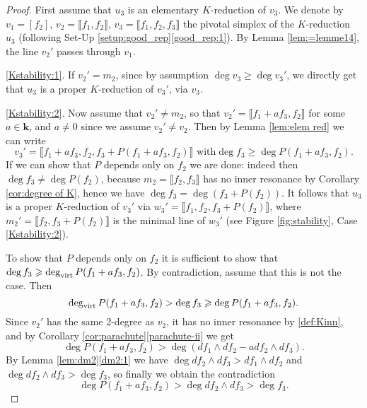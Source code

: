 \documentclass[reqno,oneside,11pt]{amsart}
\theoremstyle{plain}
\theoremstyle{definition}
\newcommand{\K}{\mathbf{k}}
\newcommand{\dvirt}{\deg_{\text{\rm virt}}}
\newcommand{\llb}{\llbracket}
\newcommand{\rrb}{\rrbracket}
\renewcommand{\ge}{\geqslant}
\begin{document}
\begin{proof}
First assume that $u_3$ is an elementary $K$-reduction of $v_3$.
We denote by $v_1 = [ f_2 ]$,
$v_2 = \llb f_1,f_2 \rrb$, $v_3 = \llb f_1, f_2, f_3 \rrb$ the pivotal simplex
of the $K$-reduction $u_3$ (following Set-Up
\ref{setup:good_rep}\ref{good_rep:1}).
By Lemma \ref{lem:=lemme14}, the line $v_2'$ passes through $v_1$.


\ref{Kstability:1}. If $v_2' = m_2$, since by
assumption $\deg v_3 \ge \deg v_3'$, we directly get that $u_3$ is a proper
$K$-reduction of $v_3'$, via $v_3$.

\ref{Kstability:2}. Now assume that $v_2' \neq m_2$, so
that $v_2' =\llb f_1 + af_3, f_2 \rrb$ for some $a \in \K$, and $a \neq 0$
since we assume $v_2' \neq v_2$.
Then by Lemma \ref{lem:elem red} we can write
$$v_3' =  \llb f_1 + af_3, f_2, f_3 +P( f_1 + af_3, f_2) \rrb \text{ with
} \deg f_3 \ge \deg P( f_1 + af_3, f_2).$$
If we can show that $P$ depends only on $f_2$ we are done: indeed then
$\deg f_3 \neq \deg P(f_2)$, because $m_2 = \llb f_2, f_3 \rrb$ has no inner
resonance by Corollary \ref{cor:degree of K}, hence we have $\deg f_3 =
\deg (f_3 + P(f_2))$.
It follows that $u_3$ is
a proper $K$-reduction of $v_3'$ via $w_3' = \llb f_1, f_2, f_3 + P(f_2) \rrb$,
where $m_2' = \llb f_2, f_3 + P(f_2) \rrb$ is the minimal line of $w_3'$ (see
Figure \ref{fig:stability}, Case \ref{Kstability:2}).

To show that $P$ depends only on $f_2$ it is sufficient to show that $\deg f_3
\ge \dvirt  P( f_1 + af_3, f_2)$.
By contradiction, assume that this is not the case.
Then
$$\dvirt  P( f_1 + af_3, f_2) > \deg f_3 \ge \deg  P( f_1 + af_3, f_2).$$
Since $v_2'$ has the same 2-degree as $v_2$, it has no inner resonance by
\ref{def:Kinn}, and by Corollary \ref{cor:parachute}\ref{parachute-ii} we get
$$\deg  P( f_1 + af_3, f_2) > \deg (df_1 \wedge df_2 - adf_2 \wedge df_3).$$
By Lemma \ref{lem:dm2}\ref{dm2:1} we have $\deg df_2 \wedge df_3 > df_1 \wedge
df_2$ and  $\deg df_2 \wedge df_3 > \deg f_3$, so finally we obtain the
contradiction
$$\deg  P( f_1 + af_3, f_2) > \deg df_2 \wedge df_3 > \deg f_3.$$


\end{proof}
\end{document}
